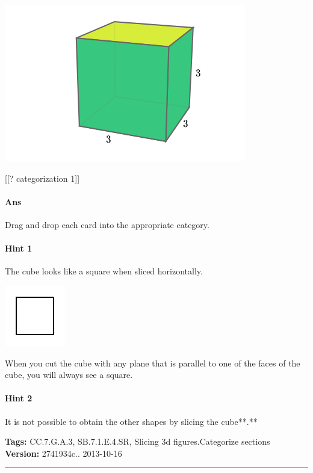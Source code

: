 \documentclass[twocolumn,10pt]{article}
\def\shrinkfactor{0.4}
\begin{document}
\includegraphics[scale=\shrinkfactor]{figures/3f4348c08edc4429693936406a5d387a49f9f22e.png}

[[? categorization 1]]

\paragraph{Ans} Drag and drop each card into the appropriate category. 

\paragraph{Hint 1}The cube looks like a square when sliced horizontally.  

\includegraphics[scale=\shrinkfactor]{figures/4b59a0ece6acc7c19c389e1de534d1df93bf1169.png}

When you cut the cube with any plane that is parallel to one of the faces of the cube, you will always see a square.

\paragraph{Hint 2}It is not possible to obtain the other shapes by slicing the cube**.**



\medskip
\noindent
\textbf{Tags:} {\footnotesize CC.7.G.A.3, SB.7.1.E.4.SR, Slicing 3d figures.Categorize sections}\\
\textbf{Version:} 2741934c.. 2013-10-16
\smallskip\hrule
\end{document}
